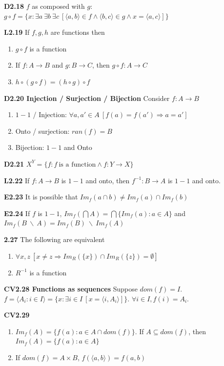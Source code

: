 \documentclass[10pt, landscape]{article}
\begin{document}
\begin{multicols*}{3}
\textbf{D2.18} $f$ as composed with $g$: $g \circ f=\{x:\exists a \ \exists b \ \exists c \ [\langle a,b \rangle \in f \land \langle b, c \rangle \in g \land x = \langle a, c \rangle]\}$

\textbf{L2.19} If $f,g,h$ are functions then
\begin{enumerate}
    \item $g \circ f$ is a function
    \item If $f:A\rightarrow B$ and $g:B\rightarrow C$, then $g \circ f: A \rightarrow C$
    \item $h \circ (g \circ f)=(h \circ g) \circ f$
\end{enumerate}

\textbf{D2.20 Injection 
 / Surjection / Bijection} Consider $f:A \rightarrow B$
\begin{enumerate}
    \item $1-1$ / Injection: $\forall a, a' \in A \ [f(a)=f(a') \Rightarrow a = a']$
    \item Onto / surjection: $ran(f)=B$
    \item Bijection: $1-1$ and Onto
\end{enumerate}

\textbf{D2.21} $X^Y=\{f:f \ \text{is a function} \land f: Y \rightarrow X\}$

\textbf{L2.22} If $f:A \rightarrow B$ is $1-1$ and onto, then $f^{-1}:B \rightarrow A$ is $1-1$ and onto.

\textbf{E2.23} It is possible that $Im_f(a \cap b) \neq Im_f(a) \cap Im_f(b)$

\textbf{E2.24} If $f$ is $1-1$, $Im_f(\bigcap A) = \bigcap\{Im_f(a):a \in A\}$ and $Im_f(B \ \backslash \ A)=Im_f(B)\ \backslash \ Im_f(A)$

\textbf{2.27} The following are equivalent
\begin{enumerate}
    \item $\forall x, z \ [x \neq z \Rightarrow Im_R(\{x\}) \cap Im_R(\{z\}) = \emptyset]$
    \item $R^{-1}$ is a function
\end{enumerate}

\textbf{CV2.28 Functions as sequences} Suppose $dom(f)=I$. $f=\langle A_i:i \in I \rangle=\{x:\exists i \in I \ [x=\langle i, A_i \rangle]\}$. $\forall i \in I, f(i) =A_i$.

\textbf{CV2.29}
\begin{enumerate}
    \item $Im_f(A)=\{f(a):a \in A \cap dom(f)\}$. If $A\subseteq dom(f)$, then $Im_f(A)=\{f(a): a \in A\}$
    \item If $dom(f)=A \times B$, $f(\langle a, b \rangle)=f(a,b)$
\end{enumerate}


\end{multicols*}
\end{document}
